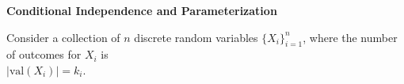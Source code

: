 \item {\bf Conditional Independence and Parameterization}

Consider a collection of $n$ discrete random variables $\{X_i\}_{i=1}^{n}$, where the number of 
outcomes for $X_i$ is \\
$\mid\text{val}(X_i)\mid=k_i$.

\begin{enumerate}

  

  

  

\end{enumerate}


